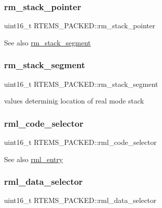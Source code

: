\subsubsection{\texorpdfstring{rm\_stack\_pointer}{rm\_stack\_pointer}}
{\footnotesize\ttfamily uint16\+\_\+t R\+T\+E\+M\+S\+\_\+\+P\+A\+C\+K\+E\+D\+::rm\+\_\+stack\+\_\+pointer}

\begin{DoxySeeAlso}{See also}
\mbox{\hyperlink{structRTEMS__PACKED_a0404760f96a07f703b889b179d1e22f4}{rm\+\_\+stack\+\_\+segment}} 
\end{DoxySeeAlso}
\mbox{\label{structRTEMS__PACKED_a0404760f96a07f703b889b179d1e22f4}} 
\subsubsection{\texorpdfstring{rm\_stack\_segment}{rm\_stack\_segment}}
{\footnotesize\ttfamily uint16\+\_\+t R\+T\+E\+M\+S\+\_\+\+P\+A\+C\+K\+E\+D\+::rm\+\_\+stack\+\_\+segment}

values determinig location of real mode stack \mbox{\label{structRTEMS__PACKED_a4f3c8b92ffc62632fd4fb1f197587f51}} 
\subsubsection{\texorpdfstring{rml\_code\_selector}{rml\_code\_selector}}
{\footnotesize\ttfamily uint16\+\_\+t R\+T\+E\+M\+S\+\_\+\+P\+A\+C\+K\+E\+D\+::rml\+\_\+code\+\_\+selector}

\begin{DoxySeeAlso}{See also}
\mbox{\hyperlink{structRTEMS__PACKED_aa8d92c8fcebd0a831db31fd7e1e1ca16}{rml\+\_\+entry}} 
\end{DoxySeeAlso}
\mbox{\label{structRTEMS__PACKED_a8b783a739190248cf9a96038e5875f37}} 
\subsubsection{\texorpdfstring{rml\_data\_selector}{rml\_data\_selector}}
{\footnotesize\ttfamily uint16\+\_\+t R\+T\+E\+M\+S\+\_\+\+P\+A\+C\+K\+E\+D\+::rml\+\_\+data\+\_\+selector}

